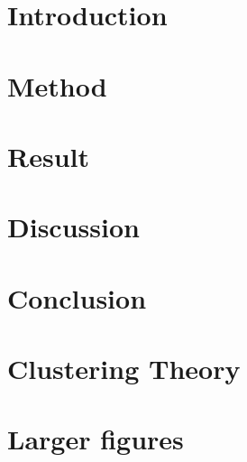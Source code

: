 \documentclass[swedish, english]{idamasterthesis}
\begin{document}


\makeintropages

\chapter{Introduction}
\label{ch:introduction}


\chapter{Method}
\label{ch:method}


\chapter{Result}
\label{ch:result}


\chapter{Discussion}
\label{ch:discussion}


\chapter{Conclusion}
\label{ch:conclusion}


\printbibliography

\begin{appendices}


\chapter{Clustering Theory}
\label{app:clustering-algorithms-theory}


\chapter{Larger figures}
\label{app:larger-figures}


\end{appendices}
\end{document}

